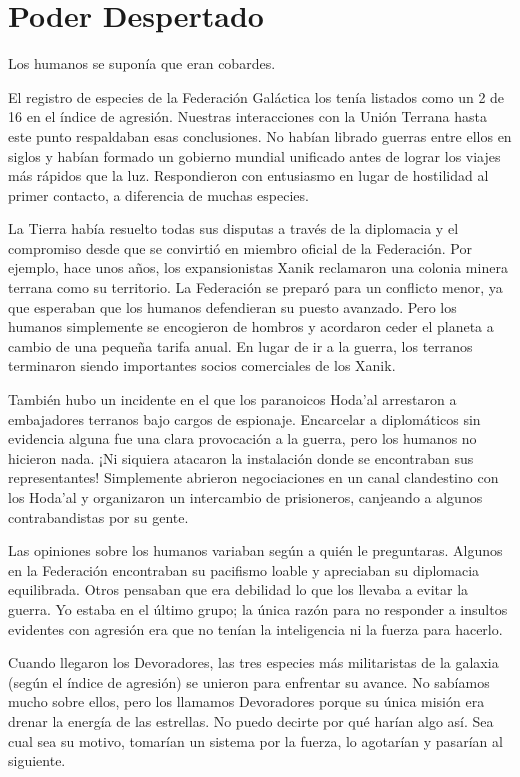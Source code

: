 \chapter{Poder Despertado}\label{sec:poder-despertado}

Los humanos se suponía que eran cobardes.

El registro de especies de la Federación Galáctica los tenía listados como un 2 de 16 en el índice de agresión. Nuestras interacciones con la Unión Terrana hasta este punto respaldaban esas conclusiones. No habían librado guerras entre ellos en siglos y habían formado un gobierno mundial unificado antes de lograr los viajes más rápidos que la luz. Respondieron con entusiasmo en lugar de hostilidad al primer contacto, a diferencia de muchas especies.

La Tierra había resuelto todas sus disputas a través de la diplomacia y el compromiso desde que se convirtió en miembro oficial de la Federación. Por ejemplo, hace unos años, los expansionistas Xanik reclamaron una colonia minera terrana como su territorio. La Federación se preparó para un conflicto menor, ya que esperaban que los humanos defendieran su puesto avanzado. Pero los humanos simplemente se encogieron de hombros y acordaron ceder el planeta a cambio de una pequeña tarifa anual. En lugar de ir a la guerra, los terranos terminaron siendo importantes socios comerciales de los Xanik.

También hubo un incidente en el que los paranoicos Hoda'al arrestaron a embajadores terranos bajo cargos de espionaje. Encarcelar a diplomáticos sin evidencia alguna fue una clara provocación a la guerra, pero los humanos no hicieron nada. ¡Ni siquiera atacaron la instalación donde se encontraban sus representantes! Simplemente abrieron negociaciones en un canal clandestino con los Hoda'al y organizaron un intercambio de prisioneros, canjeando a algunos contrabandistas por su gente.

Las opiniones sobre los humanos variaban según a quién le preguntaras. Algunos en la Federación encontraban su pacifismo loable y apreciaban su diplomacia equilibrada. Otros pensaban que era debilidad lo que los llevaba a evitar la guerra. Yo estaba en el último grupo; la única razón para no responder a insultos evidentes con agresión era que no tenían la inteligencia ni la fuerza para hacerlo.

Cuando llegaron los Devoradores, las tres especies más militaristas de la galaxia (según el índice de agresión) se unieron para enfrentar su avance. No sabíamos mucho sobre ellos, pero los llamamos Devoradores porque su única misión era drenar la energía de las estrellas. No puedo decirte por qué harían algo así. Sea cual sea su motivo, tomarían un sistema por la fuerza, lo agotarían y pasarían al siguiente.

